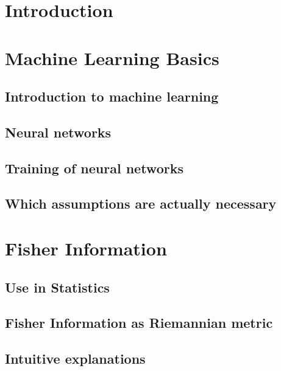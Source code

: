 \documentclass[12pt, twoside, a4paper]{report}
\begin{document}
	\chapter{Introduction}
	
	
	\chapter{Machine Learning Basics}\label{sec:ChapterMachineLearningBasics}
	\section{Introduction to machine learning}\label{sec:MachineLearningIntroduction}
	
	\section{Neural networks}\label{sec:NeuralNetworks(BigSection)}
	
	\section{Training of neural networks}\label{sec:NeuralNetworkTraining}
	
	\section{Which assumptions are actually necessary}\label{sec:WhichAssumptionsAreNecessary}
	
	
	
	\chapter{Fisher Information}\label{sec:ChapterFisherInformation}
	
	\section{Use in Statistics}\label{sec:FIinStatistics}
	
	\section{Fisher Information as Riemannian metric}\label{sec:FisherInformationAsRiemannianMetric(BigChapter)}
	
	\section{Intuitive explanations}\label{sec:FisherInterpretation}
	
\end{document}
